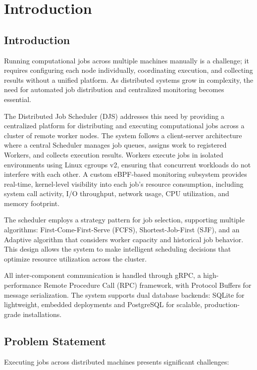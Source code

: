 \chapter{Introduction}

\section{Introduction}
Running computational jobs across multiple machines manually is a challenge; it requires configuring each node individually, coordinating execution, and collecting results without a unified platform. As distributed systems grow in complexity, the need for automated job distribution and centralized monitoring becomes essential.

The Distributed Job Scheduler (DJS) addresses this need by providing a centralized platform for distributing and executing computational jobs across a cluster of remote worker nodes. The system follows a client-server architecture where a central Scheduler manages job queues, assigns work to registered Workers, and collects execution results. Workers execute jobs in isolated environments using Linux cgroups v2, ensuring that concurrent workloads do not interfere with each other. A custom eBPF-based monitoring subsystem provides real-time, kernel-level visibility into each job's resource consumption, including system call activity, I/O throughput, network usage, CPU utilization, and memory footprint.

The scheduler employs a strategy pattern for job selection, supporting multiple algorithms: First-Come-First-Serve (FCFS), Shortest-Job-First (SJF), and an Adaptive algorithm that considers worker capacity and historical job behavior. This design allows the system to make intelligent scheduling decisions that optimize resource utilization across the cluster.

All inter-component communication is handled through gRPC, a high-performance Remote Procedure Call (RPC) framework, with Protocol Buffers for message serialization. The system supports dual database backends: SQLite for lightweight, embedded deployments and PostgreSQL for scalable, production-grade installations.

\section{Problem Statement}

Executing jobs across distributed machines presents significant challenges:

